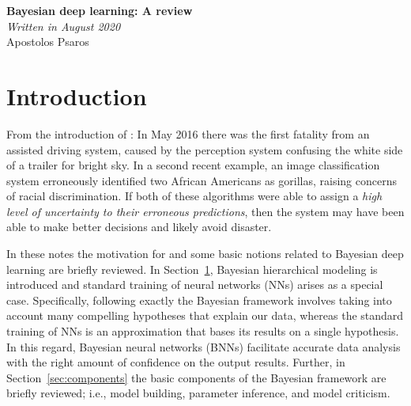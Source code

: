

\newcommand{\bw}{\boldsymbol{w}}
\newcommand{\bp}{\boldsymbol{p}}
\newcommand{\bth}{\boldsymbol{\theta}}
\newcommand{\bA}{\boldsymbol{A}}
\newcommand{\cH}{\pazocal{H}}
\newcommand{\cN}{\pazocal{N}}
\newcommand{\cP}{\pazocal{P}}
\newcommand{\cD}{\pazocal{D}}
\newcommand{\cO}{\pazocal{O}}
\newcommand{\cL}{\pazocal{L}}


\setcounter{tocdepth}{3}

	
	\sloppy
	
	\begin{center}	
		\Large
		\textbf{Bayesian deep learning: A review}\\
		\textit{Written in August 2020}\\
		\large
		Apostolos Psaros\\	
	\end{center}
	\vskip 0.25in
	
{\footnotesize
\setlength{\parskip}{0.1em}
\linespread{0.1}
\tableofcontents
\newpage}


\section{Introduction}\label{sec:introduction}

From the introduction of \textcite{kendall2017what}: In May 2016 there was the first fatality from an assisted driving system, caused by the perception system confusing the white side of a trailer for bright sky. 
In a second recent example, an image classification system erroneously identified two African Americans as gorillas, raising concerns of racial discrimination. If both of these algorithms were able to assign a \textit{high level of uncertainty to their erroneous predictions}, then the system may have been able to make better decisions and likely avoid disaster.

In these notes the motivation for and some basic notions related to Bayesian deep learning are briefly reviewed. 
In Section~\ref{sec:introduction}, Bayesian hierarchical modeling is introduced and standard training of neural networks (NNs) arises as a special case. 
Specifically, following exactly the Bayesian framework involves taking into account many compelling hypotheses that explain our data, whereas the standard training of NNs is an approximation that bases its results on a single hypothesis.
In this regard, Bayesian neural networks (BNNs) facilitate accurate data analysis with the right amount of confidence on the output results.
Further, in Section~\ref{sec:components} the basic components of the Bayesian framework are briefly reviewed; i.e., model building, parameter inference, and model criticism. 

